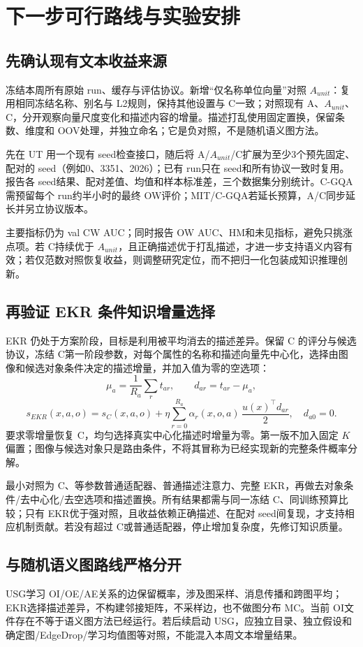 \documentclass[12pt,a4paper,UTF8]{ctexart}
\begin{document}
\section{下一步可行路线与实验安排}
\subsection{先确认现有文本收益来源}
冻结本周所有原始 run、缓存与评估协议。新增“仅名称单位向量”对照 $A_{unit}$：复用相同冻结名称、别名与 L2规则，保持其他设置与 C一致；对照现有 A、$A_{unit}$、C，分开观察向量尺度变化和描述内容的增量。描述打乱使用固定置换，保留条数、维度和 OOV处理，并独立命名；它是负对照，不是随机语义图方法。

先在 UT 用一个现有 seed检查接口，随后将 A/$A_{unit}$/C扩展为至少3个预先固定、配对的 seed（例如0、3351、2026）；已有 run只在 seed和所有协议一致时复用。报告各 seed结果、配对差值、均值和样本标准差，三个数据集分别统计。C-GQA需预留每个 run约半小时的最终 OW评价；MIT/C-GQA若延长预算，A/C同步延长并另立协议版本。

主要指标仍为 val CW AUC；同时报告 OW AUC、HM和未见指标，避免只挑涨点项。若 C持续优于 $A_{unit}$，且正确描述优于打乱描述，才进一步支持语义内容有效；若仅范数对照恢复收益，则调整研究定位，而不把归一化包装成知识推理创新。
\subsection{再验证 EKR 条件知识增量选择}
EKR 仍处于方案阶段，目标是利用被平均消去的描述差异。保留 C 的评分与候选协议，冻结 C第一阶段参数，对每个属性的名称和描述向量先中心化，选择由图像和候选对象条件决定的描述增量，并加入值为零的空选项：
\[
\mu_a=\frac1{R_a}\sum_r t_{ar},\qquad d_{ar}=t_{ar}-\mu_a,
\]
\[
s_{EKR}(x,a,o)=s_C(x,a,o)+\eta\sum_{r=0}^{R_a}
\alpha_r(x,o,a)\,\frac{u(x)^\top d_{ar}}{2},\quad d_{a0}=0.
\]
要求零增量恢复 C，均匀选择真实中心化描述时增量为零。第一版不加入固定 $K$ 偏置；图像与候选对象只是路由条件，不将其冒称为已经实现新的完整条件概率分解。

最小对照为 C、等参数普通适配器、普通描述注意力、完整 EKR，再做去对象条件/去中心化/去空选项和描述置换。所有结果都需与同一冻结 C、同训练预算比较；只有 EKR优于强对照，且收益依赖正确描述、在配对 seed间复现，才支持相应机制贡献。若没有超过 C或普通适配器，停止增加复杂度，先修订知识质量。
\subsection{与随机语义图路线严格分开}
USG学习 OI/OE/AE关系的边保留概率，涉及图采样、消息传播和跨图平均；EKR选择描述差异，不构建邻接矩阵，不采样边，也不做图分布 MC。当前 OI文件存在不等于语义图方法已经运行。若后续启动 USG，应独立目录、独立假设和确定图/EdgeDrop/学习均值图等对照，不能混入本周文本增量结果。
\end{document}
